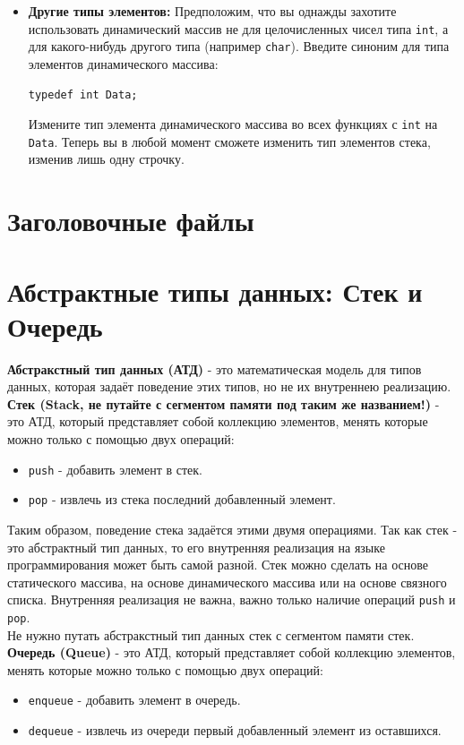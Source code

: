 \documentclass{article}
\begin{document}
\begin{itemize}
\item \textbf{Другие типы элементов:} Предположим, что вы однажды захотите использовать динамический массив не для целочисленных чисел типа \texttt{int}, а для какого-нибудь другого типа (например \texttt{char}). Введите синоним для типа элементов динамического массива:
\begin{verbatim}
typedef int Data;
\end{verbatim}
Измените тип элемента динамического массива во всех функциях с \texttt{int} на \texttt{Data}. Теперь вы в любой момент сможете изменить тип элементов стека, изменив лишь одну строчку.
\end{itemize}


\newpage
\section*{Заголовочные файлы}


\newpage
\section*{Абстрактные типы данных: Стек и Очередь}
\textbf{Абстракстный тип данных (АТД)} - это математическая модель для типов данных, которая задаёт поведение этих типов, но не их внутреннею реализацию.\\

\textbf{Стек (Stack, не путайте с сегментом памяти под таким же названием!)} - это АТД, который представляет собой коллекцию элементов, менять которые можно только с помощью двух операций:
\begin{itemize}
\item \texttt{push} - добавить элемент в стек.
\item \texttt{pop} - извлечь из стека последний добавленный элемент.
\end{itemize}
Таким образом, поведение стека задаётся этими двумя операциями. Так как стек - это абстрактный тип данных, то его внутренняя реализация на языке программирования может быть самой разной. Стек можно сделать на основе статического массива, на основе динамического массива или на основе связного списка. Внутренняя реализация не важна, важно только наличие операций \texttt{push} и \texttt{pop}. \\
Не нужно путать абстракстный тип данных стек с сегментом памяти стек.\\

\textbf{Очередь (Queue)} - это АТД, который представляет собой коллекцию элементов, менять которые можно только с помощью двух операций:
\begin{itemize}
\item \texttt{enqueue} - добавить элемент в очередь.
\item \texttt{dequeue} - извлечь из очереди первый добавленный элемент из оставшихся.
\end{itemize}
\end{document}
